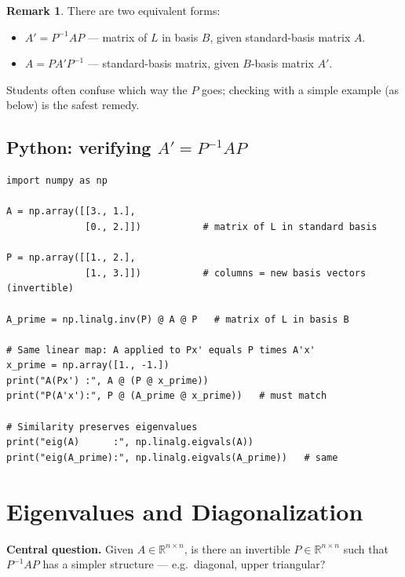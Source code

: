 \documentclass[11pt]{article}
\theoremstyle{definition}
\newtheorem{remark}{Remark}[section]
\theoremstyle{plain}
\begin{document}
\begin{remark}
There are two equivalent forms:
  \begin{itemize}
    \item $A' = P^{-1}AP$ \quad --- matrix of $L$ in basis $B$, given standard-basis matrix $A$.
    \item $A  = PA'P^{-1}$ \quad --- standard-basis matrix, given $B$-basis matrix $A'$.
  \end{itemize}
  Students often confuse which way the $P$ goes; checking with a simple
  example (as below) is the safest remedy.
  
\end{remark}

\subsection{Python: verifying $A' = P^{-1}AP$}
\begin{lstlisting}
import numpy as np

A = np.array([[3., 1.],
              [0., 2.]])           # matrix of L in standard basis

P = np.array([[1., 2.],
              [1., 3.]])           # columns = new basis vectors (invertible)

A_prime = np.linalg.inv(P) @ A @ P   # matrix of L in basis B

# Same linear map: A applied to Px' equals P times A'x'
x_prime = np.array([1., -1.])
print("A(Px') :", A @ (P @ x_prime))
print("P(A'x'):", P @ (A_prime @ x_prime))   # must match

# Similarity preserves eigenvalues
print("eig(A)      :", np.linalg.eigvals(A))
print("eig(A_prime):", np.linalg.eigvals(A_prime))   # same
\end{lstlisting}

\section{Eigenvalues and Diagonalization}


\noindent
\textbf{Central question.}  Given $A \in \mathbb{R}^{n\times n}$,
is there an invertible $P \in \mathbb{R}^{n\times n}$ such that $P^{-1}AP$
has a simpler structure --- e.g.\ diagonal, upper triangular?
\end{document}
